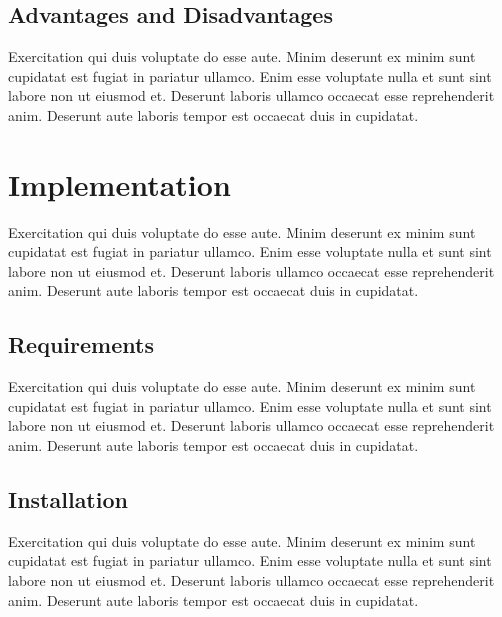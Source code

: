 \subsection{Advantages and Disadvantages} \label{subsec:advantagesDisadvantagesNeo4j}

Exercitation qui duis voluptate do esse aute. Minim deserunt ex minim sunt cupidatat est fugiat in pariatur ullamco. Enim esse voluptate nulla et sunt sint labore non ut eiusmod et. Deserunt laboris ullamco occaecat esse reprehenderit anim. Deserunt aute laboris tempor est occaecat duis in cupidatat.


\section{Implementation} \label{sec:implementationNeo4j}

Exercitation qui duis voluptate do esse aute. Minim deserunt ex minim sunt cupidatat est fugiat in pariatur ullamco. Enim esse voluptate nulla et sunt sint labore non ut eiusmod et. Deserunt laboris ullamco occaecat esse reprehenderit anim. Deserunt aute laboris tempor est occaecat duis in cupidatat.

\subsection{Requirements} \label{subsec:requirementsNeo4j}

Exercitation qui duis voluptate do esse aute. Minim deserunt ex minim sunt cupidatat est fugiat in pariatur ullamco. Enim esse voluptate nulla et sunt sint labore non ut eiusmod et. Deserunt laboris ullamco occaecat esse reprehenderit anim. Deserunt aute laboris tempor est occaecat duis in cupidatat.

\subsection{Installation} \label{subsec:installationNeo4j}

Exercitation qui duis voluptate do esse aute. Minim deserunt ex minim sunt cupidatat est fugiat in pariatur ullamco. Enim esse voluptate nulla et sunt sint labore non ut eiusmod et. Deserunt laboris ullamco occaecat esse reprehenderit anim. Deserunt aute laboris tempor est occaecat duis in cupidatat.

